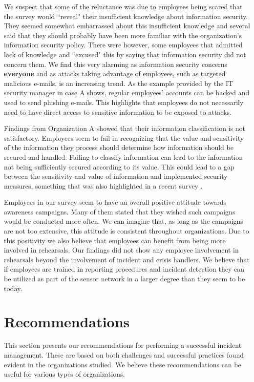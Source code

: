 We suspect that some of the reluctance was due to employees being scared that the survey would ``reveal" their insufficient knowledge about information security. They seemed somewhat embarrassed about this insufficient knowledge and several said that they should probably have been more familiar with the organization's information security policy. There were however, some employees that admitted lack of knowledge and ``excused" this by saying that information security did not concern them. We find this very alarming as information security concerns \textbf{everyone} and as attacks taking advantage of employees, such as targeted malicious e-mails, is an increasing trend. As the example provided by the IT security manager in case A shows, regular employees' accounts can be hacked and used to send phishing e-mails. This highlights that employees do not necessarily need to have direct access to sensitive information to be exposed to attacks.  

Findings from Organization A showed that their information classification is not satisfactory. Employees seem to fail in recognizing that the value and sensitivity of the information they process should determine how information should be secured and handled. Failing to classify information can lead to the information not being sufficiently secured according to its value. This could lead to a gap between the sensitivity and value of information and implemented security measures, something that was also highlighted in a recent survey \cite{Morketall2012}.

Employees in our survey seem to have an overall positive attitude towards awareness campaigns. Many of them stated that they wished such campaigns would be conducted more often. We can imagine that, as long as the campaigns are not too extensive, this attitude is consistent throughout organizations. Due to this positivity we also believe that employees can benefit from being more involved in rehearsals. Our findings did not show any employee involvement in rehearsals beyond the involvement of incident and crisis handlers. We believe that if employees are trained in reporting procedures and incident detection they can be utilized as part of the sensor network in a larger degree than they seem to be today. 

\section{Recommendations}
\label{sec:rec}
This section presents our recommendations for performing a successful incident management. These are based on both challenges and successful practices found evident in the organizations studied. We believe these recommendations can be useful for various types of organizations.

